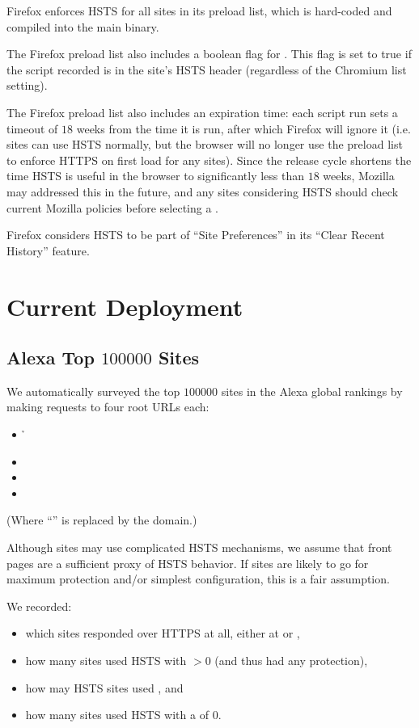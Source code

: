 \documentclass{acm_proc_article-sp}
\begin{document}
{Firefox enforces HSTS for all sites in its preload list, which is hard-coded and compiled into the main binary.

The Firefox preload list also includes a boolean flag for \iSD. This flag is set to true if the script recorded {\iSD} is in the site's HSTS header (regardless of the Chromium list setting).

The Firefox preload list also includes an expiration time: each script run sets a timeout of $18$ weeks from the time it is run, after which Firefox will ignore it (i.e. sites can use HSTS normally, but the browser will no longer use the preload list to enforce HTTPS on first load for any sites)\cite{firefox-cron-expiration}. Since the release cycle shortens the time HSTS is useful in the browser to significantly less than $18$ weeks, Mozilla may addressed this in the future, and any sites considering HSTS should check current Mozilla policies before selecting a {\ma}.

Firefox considers HSTS to be part of ``Site Preferences'' in its ``Clear Recent History'' feature.

\section{Current Deployment}
\firstsubsectionskip
\subsection{Alexa Top $100000$ Sites}

We automatically surveyed the top $100000$ sites in the Alexa global rankings\cite{alexa} by making  requests to four root URLs each:

\begin{itemize}
\item {\h}
\item {\hw}
\item {\s}
\item {\sw}
\end{itemize}

(Where ``{\site{\genericsite}}'' is replaced by the domain.)

Although sites may use complicated HSTS mechanisms, we assume that front pages are a sufficient proxy of HSTS behavior. If sites are likely to go for maximum protection and/or simplest configuration, this is a fair assumption.

We recorded:

\begin{itemize}
\item which sites responded over HTTPS at all, either at {\s} or {\sw},
\item how many sites used HSTS with {\ma}$>0$ (and thus had any protection),
\item how may HSTS sites used {\iSD}, and
\item how many sites used HSTS with a {\ma} of $0$.
\end{itemize}

}
\end{document}
